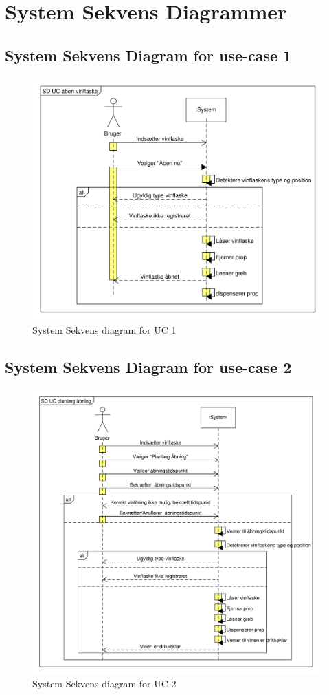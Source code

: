 \section{System Sekvens Diagrammer}

\subsection{System Sekvens Diagram for use-case 1}

\begin{figure}[H]
	\centering
	\includegraphics[scale=0.5]{SSDUC1}
	\caption{System Sekvens diagram for UC 1}
	\label{SSDUC1}
\end{figure}

\subsection{System Sekvens Diagram for use-case 2}

\begin{figure}[H]
	\centering
	\includegraphics[scale=0.5]{SSDUC2}
	\caption{System Sekvens diagram for UC 2}
	\label{SSDUC2}
\end{figure}